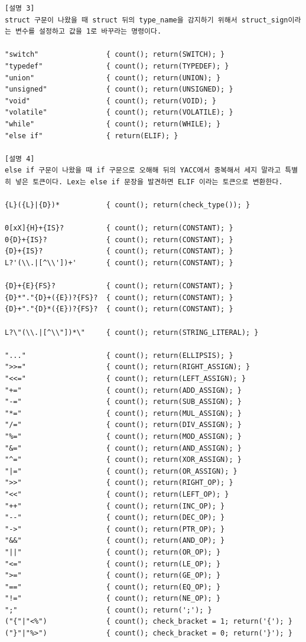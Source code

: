 \documentclass{article}
\begin{document}
\begin{verbatim}
[설명 3] 
struct 구문이 나왔을 때 struct 뒤의 type_name을 감지하기 위해서 struct_sign이라는 변수를 설정하고 값을 1로 바꾸라는 명령이다.

"switch"                { count(); return(SWITCH); }
"typedef"               { count(); return(TYPEDEF); }
"union"                 { count(); return(UNION); }
"unsigned"              { count(); return(UNSIGNED); }
"void"                  { count(); return(VOID); }
"volatile"              { count(); return(VOLATILE); }
"while"                 { count(); return(WHILE); }
"else if"		        { return(ELIF); }

[설명 4]
else if 구문이 나왔을 때 if 구문으로 오해해 뒤의 YACC에서 중복해서 세지 말라고 특별히 넣은 토큰이다. Lex는 else if 문장을 발견하면 ELIF 이라는 토큰으로 변환한다.

{L}({L}|{D})*           { count(); return(check_type()); }

0[xX]{H}+{IS}?          { count(); return(CONSTANT); }
0{D}+{IS}?              { count(); return(CONSTANT); }
{D}+{IS}?               { count(); return(CONSTANT); }
L?'(\\.|[^\\'])+'       { count(); return(CONSTANT); }

{D}+{E}{FS}?            { count(); return(CONSTANT); }
{D}*"."{D}+({E})?{FS}?  { count(); return(CONSTANT); }
{D}+"."{D}*({E})?{FS}?  { count(); return(CONSTANT); }

L?\"(\\.|[^\\"])*\"     { count(); return(STRING_LITERAL); }

"..."                   { count(); return(ELLIPSIS); }
">>="                   { count(); return(RIGHT_ASSIGN); }
"<<="                   { count(); return(LEFT_ASSIGN); }
"+="                    { count(); return(ADD_ASSIGN); }
"-="                    { count(); return(SUB_ASSIGN); }
"*="                    { count(); return(MUL_ASSIGN); }
"/="                    { count(); return(DIV_ASSIGN); }
"%="                    { count(); return(MOD_ASSIGN); }
"&="                    { count(); return(AND_ASSIGN); }
"^="                    { count(); return(XOR_ASSIGN); }
"|="                    { count(); return(OR_ASSIGN); }
">>"                    { count(); return(RIGHT_OP); }
"<<"                    { count(); return(LEFT_OP); }
"++"                    { count(); return(INC_OP); }
"--"                    { count(); return(DEC_OP); }
"->"                    { count(); return(PTR_OP); }
"&&"                    { count(); return(AND_OP); }
"||"                    { count(); return(OR_OP); }
"<="                    { count(); return(LE_OP); }
">="                    { count(); return(GE_OP); }
"=="                    { count(); return(EQ_OP); }
"!="                    { count(); return(NE_OP); }
";"                     { count(); return(';'); }
("{"|"<%")              { count(); check_bracket = 1; return('{'); }
("}"|"%>")              { count(); check_bracket = 0; return('}'); }


\end{verbatim}
\end{document}
